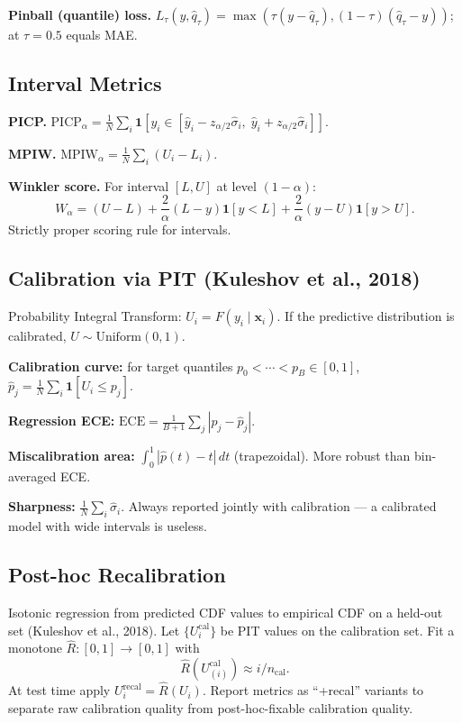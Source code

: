 \documentclass[11pt,a4paper]{article}
\theoremstyle{definition}
\newcommand{\bx}{\mathbf{x}}
\begin{document}
\textbf{Pinball (quantile) loss.}
$L_\tau(y, \hat{q}_\tau) = \max(\tau(y - \hat{q}_\tau), (1-\tau)(\hat{q}_\tau - y))$;
at $\tau = 0.5$ equals MAE.

\subsection{Interval Metrics}

\textbf{PICP.}
$\text{PICP}_\alpha = \frac{1}{N}\sum_{i} \mathbf{1}[y_i \in [\hat{y}_i - z_{\alpha/2}\hat{\sigma}_i,\; \hat{y}_i + z_{\alpha/2}\hat{\sigma}_i]]$.

\textbf{MPIW.}
$\text{MPIW}_\alpha = \frac{1}{N}\sum_{i}(U_i - L_i)$.

\textbf{Winkler score.} For interval $[L, U]$ at level $(1-\alpha)$:
\begin{equation}
  W_\alpha = (U - L) +
  \frac{2}{\alpha}(L - y)\mathbf{1}[y < L] +
  \frac{2}{\alpha}(y - U)\mathbf{1}[y > U].
  \label{eq:winkler}
\end{equation}
Strictly proper scoring rule for intervals.

\subsection{Calibration via PIT (Kuleshov et al., 2018)}
\label{sec:pit_cal}

Probability Integral Transform: $U_i = F(y_i \mid \bx_i)$. If the
predictive distribution is calibrated, $U \sim \text{Uniform}(0, 1)$.

\textbf{Calibration curve:} for target quantiles
$p_0 < \cdots < p_B \in [0,1]$,
$\hat{p}_j = \frac{1}{N}\sum_i \mathbf{1}[U_i \leq p_j]$.

\textbf{Regression ECE:} $\text{ECE} = \frac{1}{B+1}\sum_{j} |p_j - \hat{p}_j|$.

\textbf{Miscalibration area:} $\int_0^1 |\hat{p}(t) - t| \, dt$ (trapezoidal).
More robust than bin-averaged ECE.

\textbf{Sharpness:} $\frac{1}{N}\sum_{i} \hat{\sigma}_i$. Always reported
jointly with calibration --- a calibrated model with wide intervals is
useless.

\subsection{Post-hoc Recalibration}
\label{sec:isotonic}

Isotonic regression from predicted CDF values to empirical CDF on a
held-out set (Kuleshov et al., 2018). Let $\{U_i^{\mathrm{cal}}\}$ be PIT
values on the calibration set. Fit a monotone $\hat{R}: [0,1] \to [0,1]$
with
\[
  \hat{R}(U_{(i)}^{\mathrm{cal}}) \approx i / n_{\mathrm{cal}}.
\]
At test time apply $U_i^{\mathrm{recal}} = \hat{R}(U_i)$. Report metrics
as ``+recal'' variants to separate raw calibration quality from
post-hoc-fixable calibration quality.
\end{document}
